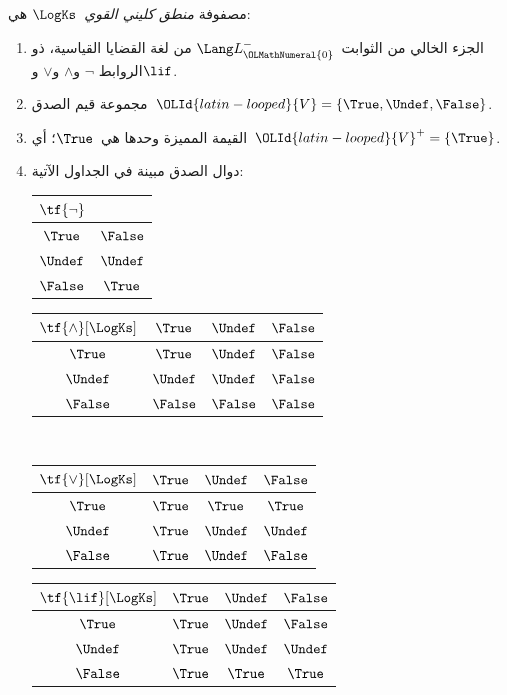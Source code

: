 \documentclass[../../../include/open-logic-section]{subfiles}
\begin{document}
\begin{defn}
مصفوفة \emph{منطق كليني القوي}~$\LogKs$ هي:
\begin{enumerate}
  \item الجزء الخالي من الثوابت~$\Lang L_{\OLMathNumeral{0}}^{-}$ من لغة القضايا القياسية، ذو الروابط
  $\lnot$ و$\land$ و$\lor$ و$\lif$.
  \item مجموعة قيم الصدق~${\OLId{latin-looped}{V}} = \{\True, \Undef, \False\}$.
  \item القيمة المميزة وحدها هي~$\True$؛ أي~${\OLId{latin-looped}{V}}^+ = \{\True\}$.
  \item دوال الصدق مبينة في الجداول الآتية:
  \begin{center}
    \begin{tabular}{c|c}
      $\tf{\lnot}$ & \\
      \hline
      $\True$ & $\False$ \\
      $\Undef$ & $\Undef$ \\
      $\False$ & $\True$
    \end{tabular}
    \quad
    \begin{tabular}{c|ccc}
      $\tf{\land}[\LogKs]$ & $\True$ & $\Undef$ & $\False$ \\
      \hline
      $\True$ & $\True$ & $\Undef$ & $\False$ \\
      $\Undef$ & $\Undef$ & $\Undef$ & $\False$\\
      $\False$ & $\False$ & $\False$ & $\False$
    \end{tabular}
    \\[2ex]
    \begin{tabular}{c|ccc}
      $\tf{\lor}[\LogKs]$ & $\True$ & $\Undef$ & $\False$ \\
      \hline
      $\True$ & $\True$ & $\True$ & $\True$ \\
      $\Undef$ & $\True$ & $\Undef$ & $\Undef$ \\
      $\False$ & $\True$ & $\Undef$ & $\False$
    \end{tabular}
    \quad
    \begin{tabular}{c|ccc}
      $\tf{\lif}[\LogKs]$ & $\True$ & $\Undef$ & $\False$ \\
      \hline
      $\True$ & $\True$ & $\Undef$ & $\False$ \\
      $\Undef$ & $\True$ & $\Undef$ & $\Undef$  \\
      $\False$ & $\True$ & $\True$ & $\True$
    \end{tabular}
  \end{center}
\end{enumerate}
\end{defn}
\end{document}
